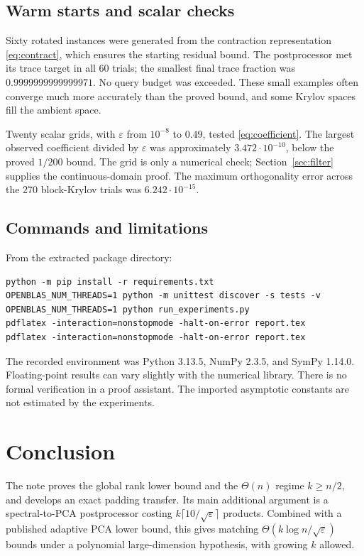 \documentclass[11pt]{article}
\numberwithin{equation}{section}
\theoremstyle{definition}
\newcommand{\eps}{\varepsilon}
\begin{document}
\subsection{Warm starts and scalar checks}
Sixty rotated instances were generated from the contraction representation
\eqref{eq:contract}, which ensures the starting residual bound. The
postprocessor met its trace target in all 60 trials; the smallest final
trace fraction was $0.9999999999999971$. No query budget was exceeded.
These small examples often converge much more accurately than the proved
bound, and some Krylov spaces fill the ambient space.

Twenty scalar grids, with $\eps$ from $10^{-8}$ to $0.49$, tested
\eqref{eq:coefficient}. The largest observed coefficient divided by $\eps$
was approximately $3.472\cdot10^{-10}$, below the proved $1/200$ bound.
The grid is only a numerical check; Section~\ref{sec:filter} supplies the
continuous-domain proof. The maximum orthogonality error across the 270
block-Krylov trials was $6.242\cdot10^{-15}$.

\subsection{Commands and limitations}
From the extracted package directory:
\begin{verbatim}
python -m pip install -r requirements.txt
OPENBLAS_NUM_THREADS=1 python -m unittest discover -s tests -v
OPENBLAS_NUM_THREADS=1 python run_experiments.py
pdflatex -interaction=nonstopmode -halt-on-error report.tex
pdflatex -interaction=nonstopmode -halt-on-error report.tex
\end{verbatim}
The recorded environment was Python 3.13.5, NumPy 2.3.5, and SymPy 1.14.0.
Floating-point results can vary slightly with the numerical library. There
is no formal verification in a proof assistant. The imported asymptotic
constants are not estimated by the experiments.

\section{Conclusion}
The note proves the global rank lower bound and the $\Theta(n)$ regime
$k\ge n/2$, and develops an exact padding transfer. Its main additional
argument is a spectral-to-PCA postprocessor costing
$k\lceil10/\sqrt\eps\rceil$ products. Combined with a published adaptive
PCA lower bound, this gives matching $\Theta(k\log n/\sqrt\eps)$ bounds
under a polynomial large-dimension hypothesis, with growing $k$ allowed.
\end{document}
